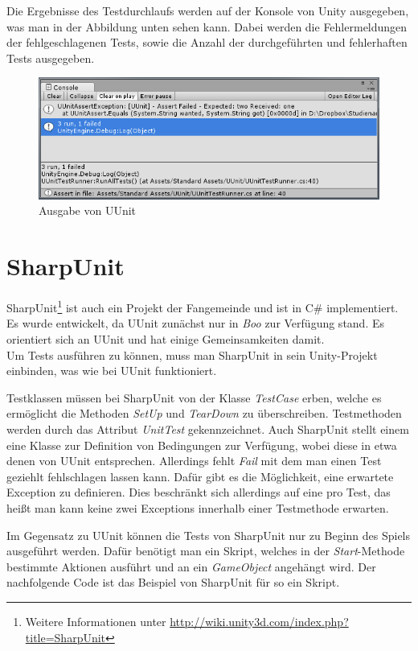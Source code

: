 Die Ergebnisse des Testdurchlaufs werden auf der Konsole von Unity ausgegeben, was man in der Abbildung unten sehen kann. Dabei werden die Fehlermeldungen der fehlgeschlagenen Tests, sowie die Anzahl der durchgeführten und fehlerhaften Tests ausgegeben.

\begin{figure}[h]
\centering
\includegraphics[width=1\linewidth]{./images/Kapitel_UnitTestsMitUnity/UUnit_Konsolenausgabe}
\caption[Ausgabe von UUnit]{Ausgabe von UUnit}
\label{fig:UUnit_Konsolenausgabe}
\end{figure}

\section{SharpUnit}\label{sec:SharpUnit}

SharpUnit\footnote{Weitere Informationen unter \url{http://wiki.unity3d.com/index.php?title=SharpUnit}} ist auch ein Projekt der Fangemeinde und ist in C\# implementiert. Es wurde entwickelt, da UUnit zunächst nur in \textit{Boo} zur Verfügung stand. Es orientiert sich an UUnit und hat einige Gemeinsamkeiten damit.\\
Um Tests ausführen zu können, muss man SharpUnit in sein Unity-Projekt einbinden, was wie bei UUnit funktioniert.

Testklassen müssen bei SharpUnit von der Klasse \textit{TestCase} erben, welche es ermöglicht die Methoden \textit{SetUp} und \textit{TearDown} zu überschreiben. Testmethoden werden durch das Attribut \textit{UnitTest} gekennzeichnet. Auch SharpUnit stellt einem eine Klasse zur Definition von Bedingungen zur Verfügung, wobei diese in etwa denen von UUnit entsprechen. Allerdings fehlt \textit{Fail} mit dem man einen Test geziehlt fehlschlagen lassen kann. Dafür gibt es die Möglichkeit, eine erwartete Exception zu definieren. Dies beschränkt sich allerdings auf eine pro Test, das heißt man kann keine zwei Exceptions innerhalb einer Testmethode erwarten.
 
Im Gegensatz zu UUnit können die Tests von SharpUnit nur zu Beginn des Spiels ausgeführt werden. Dafür benötigt man ein Skript, welches in der \textit{Start}-Methode bestimmte Aktionen ausführt und an ein \textit{GameObject} angehängt wird. Der nachfolgende Code ist das Beispiel von SharpUnit für so ein Skript.

